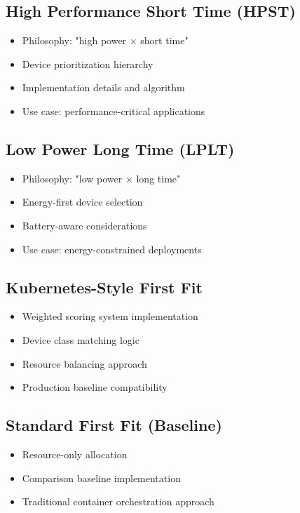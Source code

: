\documentclass[12pt,a4paper]{report}
\begin{document}
\subsection{High Performance Short Time (HPST)}
\begin{itemize}[leftmargin=1cm]
    \item Philosophy: "high power × short time"
    \item Device prioritization hierarchy
    \item Implementation details and algorithm
    \item Use case: performance-critical applications
\end{itemize}

\subsection{Low Power Long Time (LPLT)}
\begin{itemize}[leftmargin=1cm]
    \item Philosophy: "low power × long time"
    \item Energy-first device selection
    \item Battery-aware considerations
    \item Use case: energy-constrained deployments
\end{itemize}

\subsection{Kubernetes-Style First Fit}
\begin{itemize}[leftmargin=1cm]
    \item Weighted scoring system implementation
    \item Device class matching logic
    \item Resource balancing approach
    \item Production baseline compatibility
\end{itemize}

\subsection{Standard First Fit (Baseline)}
\begin{itemize}[leftmargin=1cm]
    \item Resource-only allocation
    \item Comparison baseline implementation
    \item Traditional container orchestration approach
\end{itemize}
\end{document}
